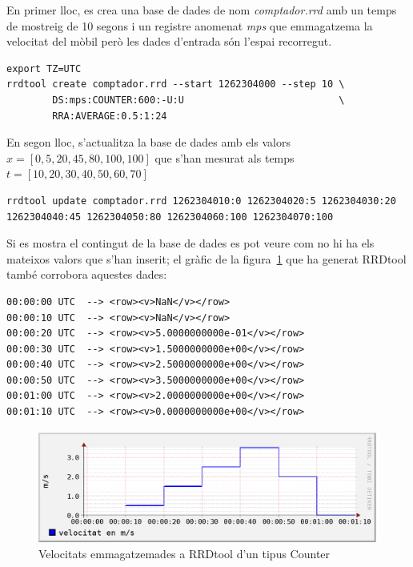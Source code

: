 En primer lloc, es crea una base de dades de nom \emph{comptador.rrd} amb un temps de mostreig de 10 segons i un registre anomenat \emph{mps} que emmagatzema la velocitat del mòbil però les dades d'entrada són l'espai recorregut.
\begin{lstlisting}[style=sh]
export TZ=UTC
rrdtool create comptador.rrd --start 1262304000 --step 10 \
        DS:mps:COUNTER:600:-U:U                           \ 
        RRA:AVERAGE:0.5:1:24                                                   
\end{lstlisting}

En segon lloc, s'actualitza la base de dades amb els valors $x=[0,5,20,45,80,100,100]$ que s'han mesurat als temps $t=[10,20,30,40,50,60,70]$ 

\begin{lstlisting}[style=sh]
rrdtool update comptador.rrd 1262304010:0 1262304020:5 1262304030:20 1262304040:45 1262304050:80 1262304060:100 1262304070:100
\end{lstlisting}

Si es mostra el contingut de la base de dades es pot veure com no hi ha els mateixos valors que s'han inserit; 
el gràfic de la figura~\ref{fig:rrdtool:comptador} que ha generat  RRDtool també corrobora aquestes dades:
\begin{lstlisting}
00:00:00 UTC  --> <row><v>NaN</v></row>
00:00:10 UTC  --> <row><v>NaN</v></row>
00:00:20 UTC  --> <row><v>5.0000000000e-01</v></row>
00:00:30 UTC  --> <row><v>1.5000000000e+00</v></row>
00:00:40 UTC  --> <row><v>2.5000000000e+00</v></row>
00:00:50 UTC  --> <row><v>3.5000000000e+00</v></row>
00:01:00 UTC  --> <row><v>2.0000000000e+00</v></row>
00:01:10 UTC  --> <row><v>0.0000000000e+00</v></row>
\end{lstlisting}

 
\begin{figure}[htp]
  \centering
  \includegraphics[width=\textwidth]{imatges/rrdtool/comptador.eps}
  \caption{Velocitats emmagatzemades a RRDtool d'un tipus Counter}
  \label{fig:rrdtool:comptador}
\end{figure}

